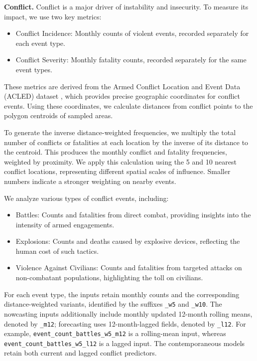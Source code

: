 \documentclass[pdflatex,sn-mathphys-num]{sn-jnl}%
\theoremstyle{thmstyleone}%
\theoremstyle{thmstyletwo}%
\theoremstyle{thmstylethree}%
\begin{document}
\noindent\textbf{Conflict.} 
Conflict is a major driver of instability and insecurity. To measure its impact, we use two key metrics:
\begin{itemize}
\item Conflict Incidence: Monthly counts of violent events, recorded separately for each event type.
\item Conflict Severity: Monthly fatality counts, recorded separately for the same event types.
\end{itemize}
These metrics are derived from the Armed Conflict Location and Event Data (ACLED) dataset \cite{raleigh2010introducing}, which provides precise geographic coordinates for conflict events. Using these coordinates, we calculate distances from conflict points to the polygon centroids of sampled areas.

To generate the inverse distance-weighted frequencies, we multiply the total number of conflicts or fatalities at each location by the inverse of its distance to the centroid. This produces the monthly conflict and fatality frequencies, weighted by proximity. We apply this calculation using the 5 and 10 nearest conflict locations, representing different spatial scales of influence. Smaller numbers indicate a stronger weighting on nearby events.

We analyze various types of conflict events, including:
\begin{itemize}
\item Battles: Counts and fatalities from direct combat, providing insights into the intensity of armed engagements.
\item Explosions: Counts and deaths caused by explosive devices, reflecting the human cost of such tactics.
\item Violence Against Civilians: Counts and fatalities from targeted attacks on non-combatant populations, highlighting the toll on civilians.
\end{itemize}

For each event type, the inputs retain monthly counts and the corresponding distance-weighted variants, identified by the suffixes \texttt{\_w5} and \texttt{\_w10}. The nowcasting inputs additionally include monthly updated 12-month rolling means, denoted by \texttt{\_m12}; forecasting uses 12-month-lagged fields, denoted by \texttt{\_l12}. For example, \texttt{event\_count\_battles\_w5\_m12} is a rolling-mean input, whereas \texttt{event\_count\_battles\_w5\_l12} is a lagged input. The contemporaneous models retain both current and lagged conflict predictors.
\end{document}
